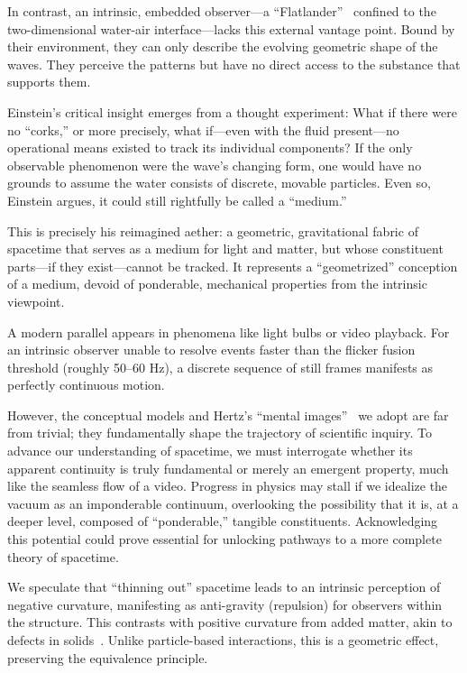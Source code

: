 \documentclass[%
  reprint,
  superscriptaddress,
  showpacs,
  showkeys,
  amsmath,amssymb,
  pra,
  longbibliography,
  floatfix,
  x11names
]{revtex4-2}
\begin{document}
In contrast, an intrinsic, embedded observer---a ``Flatlander''~\cite{abbott-flatland} confined to the two-dimensional water-air interface---lacks this external vantage point. Bound by their environment, they can only describe the evolving geometric shape of the waves. They perceive the patterns but have no direct access to the substance that supports them.

Einstein's critical insight emerges from a thought experiment: What if there were no ``corks,'' or more precisely, what if---even with the fluid present---no operational means existed to track its individual components? If the only observable phenomenon were the wave's changing form, one would have no grounds to assume the water consists of discrete, movable particles. Even so, Einstein argues, it could still rightfully be called a ``medium.''

This is precisely his reimagined aether: a geometric, gravitational fabric of spacetime that serves as a medium for light and matter, but whose constituent parts---if they exist---cannot be tracked. It represents a ``geometrized'' conception of a medium, devoid of ponderable, mechanical properties from the intrinsic viewpoint.

A modern parallel appears in phenomena like light bulbs or video playback. For an intrinsic observer unable to resolve events faster than the flicker fusion threshold (roughly 50--60 Hz), a discrete sequence of still frames manifests as perfectly continuous motion.

However, the conceptual models and Hertz's ``mental images''~\cite{hertz-94e} we adopt are far from trivial; they fundamentally shape the trajectory of scientific inquiry. To advance our understanding of spacetime, we must interrogate whether its apparent continuity is truly fundamental or merely an emergent property, much like the seamless flow of a video. Progress in physics may stall if we idealize the vacuum as an imponderable continuum, overlooking the possibility that it is, at a deeper level, composed of ``ponderable,'' tangible constituents. Acknowledging this potential could prove essential for unlocking pathways to a more complete theory of spacetime.

We speculate that ``thinning out'' spacetime leads to an intrinsic perception of negative curvature, manifesting as anti-gravity (repulsion) for observers within the structure. This contrasts with positive curvature from added matter, akin to defects in solids~\cite{Kroner-1958,kroner-1990}. Unlike particle-based interactions, this is a geometric effect, preserving the equivalence principle.
\end{document}
